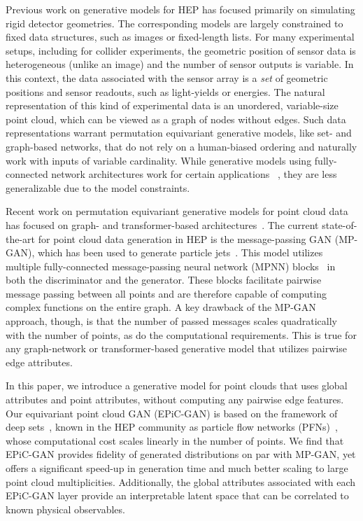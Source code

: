 \documentclass[a4paper,submission, Phys]{SciPost}
\begin{document}
Previous work on generative models for HEP has focused primarily on simulating rigid detector geometries.
%
The corresponding models are largely constrained to fixed data structures, such as images or fixed-length lists.
%
For many experimental setups, including for collider experiments, the geometric position of sensor data is heterogeneous (unlike an image) and the number of sensor outputs is variable.
%
In this context, the data associated with the sensor array is a \emph{set} of geometric positions and sensor readouts, such as light-yields or energies.
%
The natural representation of this kind of experimental data is an unordered, variable-size point cloud, which can be viewed as a graph of nodes without edges.
%
Such data representations warrant permutation equivariant generative models, like set- and graph-based networks, that do not rely on a human-biased ordering and naturally work with inputs of variable cardinality.
% 
While generative models using fully-connected network architectures work for certain applications~ \cite{Touranakou_2022_ParticleVAE_Mary, JetFlow}, they are less generalizable due to the model constraints.

Recent work on permutation equivariant generative models for point cloud data has focused on graph- and transformer-based architectures~\cite{SetTransformer, TSPN_tranformer,  SetVAE_Transformer, MPGAN, ConditionalGNN_2211.06406, RaghavMetrics, point-e_2212.08751}.
%
The current state-of-the-art for point cloud data generation in HEP is the message-passing GAN (MP-GAN), which has been used to  generate particle jets~\cite{MPGAN}.
%
This model utilizes multiple fully-connected message-passing neural network (MPNN) blocks~\cite{MPNN} in both the discriminator and the generator.
%
These blocks facilitate pairwise message passing between all points and are therefore capable of computing complex functions on the entire graph.
%
A key drawback of the MP-GAN approach, though, is that the number of passed messages scales quadratically with the number of points, as do the computational requirements. 
%
This is true for any graph-network or transformer-based generative model that utilizes pairwise edge attributes. 


In this paper, we introduce a generative model for point clouds that uses global attributes and point attributes, without computing any pairwise edge features.
%
Our equivariant point cloud GAN (EPiC-GAN) is based on the framework of deep sets~\cite{DeepSets}, known in the HEP community as particle flow networks (PFNs)~\cite{Komiske:2018cqr}, whose computational cost scales linearly in the number of points.
%
We find that EPiC-GAN provides fidelity of generated distributions on par with MP-GAN, yet offers a significant speed-up in generation time and much better scaling to large point cloud multiplicities.
%
Additionally, the global attributes associated with each EPiC-GAN layer provide an interpretable latent space that can be correlated to known physical observables.
\end{document}
